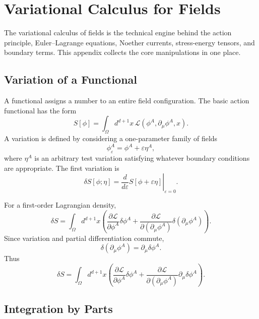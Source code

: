 \chapter{Variational Calculus for Fields}

\begin{remarkbox}
The variational calculus of fields is the technical engine behind the action
principle, Euler--Lagrange equations, Noether currents, stress-energy tensors,
and boundary terms. This appendix collects the core manipulations in one place.
\end{remarkbox}

\section{Variation of a Functional}

A functional assigns a number to an entire field configuration. The basic action
functional has the form
\[
    S[\phi]=\int_\Omega d^{d+1}x\,\mathcal{L}(\phi^A,\partial_\mu\phi^A,x).
\]
A variation is defined by considering a one-parameter family of fields
\[
    \phi^A_\varepsilon=\phi^A+\varepsilon\eta^A,
\]
where \(\eta^A\) is an arbitrary test variation satisfying whatever boundary
conditions are appropriate. The first variation is
\[
    \delta S[\phi;\eta]
    =\left.\frac{d}{d\varepsilon}S[\phi+\varepsilon\eta]\right|_{\varepsilon=0}.
\]

For a first-order Lagrangian density,
\[
    \delta S
    =\int_\Omega d^{d+1}x\left(
        \frac{\partial\mathcal{L}}{\partial\phi^A}\delta\phi^A
        +\frac{\partial\mathcal{L}}{\partial(\partial_\mu\phi^A)}
        \delta(\partial_\mu\phi^A)
    \right).
\]
Since variation and partial differentiation commute,
\[
    \delta(\partial_\mu\phi^A)=\partial_\mu\delta\phi^A.
\]
Thus
\[
    \delta S
    =\int_\Omega d^{d+1}x\left(
        \frac{\partial\mathcal{L}}{\partial\phi^A}\delta\phi^A
        +\frac{\partial\mathcal{L}}{\partial(\partial_\mu\phi^A)}
        \partial_\mu\delta\phi^A
    \right).
\]

\section{Integration by Parts}

